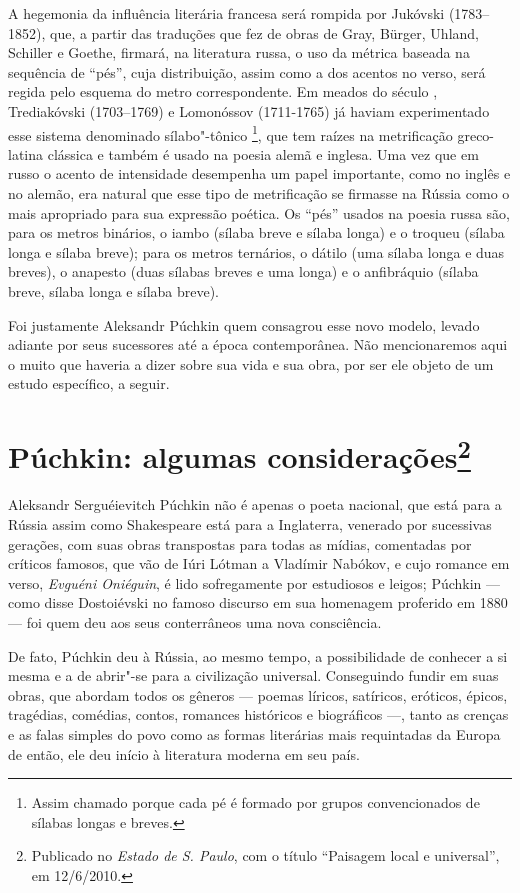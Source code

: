 A hegemonia da influência literária francesa será rompida por Jukóvski (1783--1852),
que, a partir das traduções que fez de obras de Gray, Bürger, Uhland,
Schiller e Goethe, firmará, na literatura russa, o uso da métrica baseada
na sequência de ``pés'', cuja distribuição, assim como a dos
acentos no verso, será regida pelo esquema do metro correspondente. Em
meados do século , Trediakóvski (1703--1769)
e Lomonóssov (1711-1765) já haviam
experimentado esse sistema denomina­do sílabo"-tônico \footnote{Assim chamado porque cada pé é formado por grupos convencionados de sílabas longas e breves.}, que tem raízes na
metrificação greco-latina clássica e tam­bém é usado na poesia alemã e
inglesa. Uma vez que em russo o acento de intensidade desempenha um
papel importante, como no inglês e no alemão, era natural que esse tipo
de metrificação se firmasse na Rússia como o mais apropriado para
sua expressão poética. Os ``pés'' usados na poesia russa são, para os
metros binários, o iambo (sílaba breve e sílaba longa) e o troqueu
(sílaba longa e sílaba breve); para os metros ternários, o dátilo (uma
sílaba lon­ga e duas breves), o anapesto (duas sílabas breves e uma
longa) e o anfibráquio (sílaba breve, sílaba longa e sílaba breve).

Foi justamente Aleksandr Púchkin quem consagrou esse novo modelo, levado
adiante por seus sucessores até a época contemporânea. Não mencionaremos
aqui o muito que haveria a dizer sobre sua vida e sua obra, por ser ele
objeto de um estudo específico, a seguir.

\chapter{Púchkin: algumas considerações\footnote{Publicado no \emph{Estado de S. Paulo}, com o título ``Paisagem local e universal'', em 12/6/2010.}}

Aleksandr Serguéievitch Púchkin não é apenas o poeta nacional, que está
para a Rússia assim como Shakespeare está para a Inglaterra, venerado
por sucessivas gerações, com suas obras transpostas para todas as
mídias, comentadas por críticos famosos, que vão de Iúri Lótman a
Vladímir Nabókov, e cujo romance em verso, \emph{Evguéni Oniéguin}, é lido
sofregamente por estudiosos e leigos; Púchkin --- como disse
Dostoiévski no famoso discurso em sua homenagem proferido em 1880 --- foi quem deu aos seus conterrâneos uma nova consciência.

De fato, Púchkin deu à Rússia, ao mesmo tempo, a possibilidade de
conhecer a si mesma e a de abrir"-se para a civilização universal.
Conseguindo fundir em suas obras, que abordam todos os gêneros --- poemas
líricos, satíricos, eróticos, épicos, tragédias, comédias, contos,
romances históricos e biográficos ---, tanto as crenças e as falas simples
do povo como as formas literárias mais requintadas da Europa de então,
ele deu início à literatura moderna em seu país.

